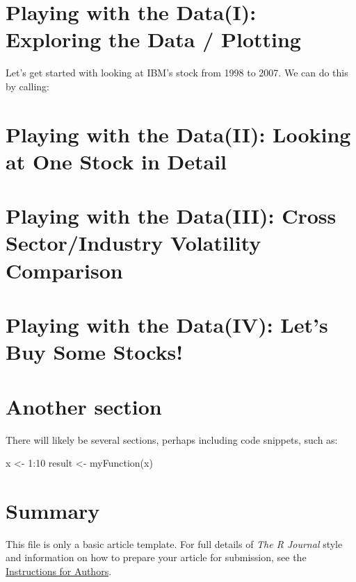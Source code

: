 \section{Playing with the Data(I): Exploring the Data / Plotting}

Let's get started with looking at IBM's stock from 1998 to 2007. We can do this by calling:



\section{Playing with the Data(II): Looking at One Stock in Detail}

\section{Playing with the Data(III): Cross Sector/Industry Volatility Comparison}

\section{Playing with the Data(IV): Let's Buy Some Stocks!}










\section{Another section}

There will likely be several sections, perhaps including code snippets, such as:

\begin{example}
  x <- 1:10
  result <- myFunction(x)
\end{example}










\section{Summary}

This file is only a basic article template. For full details of \emph{The R Journal} style and information on how to prepare your article for submission, see the \href{http://journal.r-project.org/latex/RJauthorguide.pdf}{Instructions for Authors}.



\address{Author One\\
  Affiliation\\
  Address\\
  Country\\}

\address{Author Two\\
  Affiliation\\
  Address\\
  Country\\}

\address{Author Three\\
  Affiliation\\
  Address\\
  Country\\}
